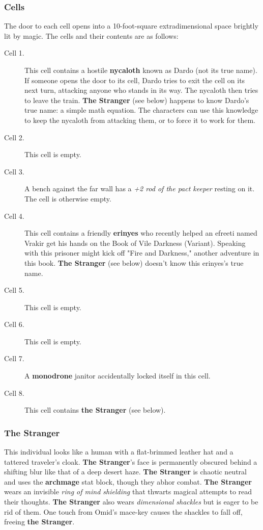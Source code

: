 \documentclass[10pt,a4paper,twoside,bg=print,twocolumn,openany,nodeprecatedcode]{dndarticle}
\begin{document}
\subsubsection{Cells}
The door to each cell opens into a 10-foot-square extradimensional space brightly lit by magic. The cells and their contents are as follows:


\begin{description}
\item[Cell 1.]
This cell contains a hostile \textbf{nycaloth} known as Dardo (not its true name). If someone opens the door to its cell, Dardo tries to exit the cell on its next turn, attacking anyone who stands in its way. The nycaloth then tries to leave the train. \textbf{The Stranger} (see below) happens to know Dardo's true name: a simple math equation. The characters can use this knowledge to keep the nycaloth from attacking them, or to force it to work for them.
\item[Cell 2.]
This cell is empty.
\item[Cell 3.]
A bench against the far wall has a \textit{+2 rod of the pact keeper} resting on it. The cell is otherwise empty.
\item[Cell 4.]
This cell contains a friendly \textbf{erinyes} who recently helped an efreeti named Vrakir get his hands on the Book of Vile Darkness (Variant). Speaking with this prisoner might kick off "Fire and Darkness," another adventure in this book. \textbf{The Stranger} (see below) doesn't know this erinyes's true name.
\item[Cell 5.]
This cell is empty.
\item[Cell 6.]
This cell is empty.
\item[Cell 7.]
A \textbf{monodrone} janitor accidentally locked itself in this cell.
\item[Cell 8.]
This cell contains \textbf{the Stranger} (see below).
\end{description}

\subsubsection{The Stranger}
This individual looks like a human with a flat-brimmed leather hat and a tattered traveler's cloak. \textbf{The Stranger}'s face is permanently obscured behind a shifting blur like that of a deep desert haze. \textbf{The Stranger} is chaotic neutral and uses the \textbf{archmage} stat block, though they abhor combat. \textbf{The Stranger} wears an invisible \textit{ring of mind shielding} that thwarts magical attempts to read their thoughts. \textbf{The Stranger} also wears \textit{dimensional shackles} but is eager to be rid of them. One touch from Omid's mace-key causes the shackles to fall off, freeing \textbf{the Stranger}.
\end{document}
